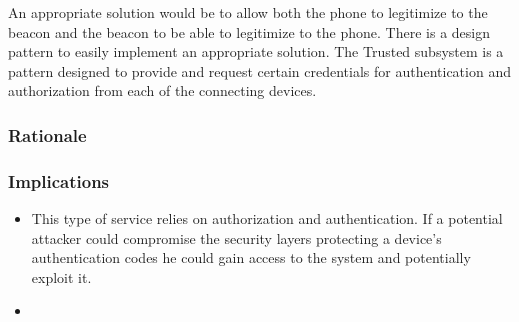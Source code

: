 		An appropriate solution would be to allow both the phone to legitimize to the beacon and the beacon to be able to legitimize to the phone. There is a design pattern to easily implement an appropriate solution. The Trusted subsystem is a pattern designed to provide and request certain credentials for authentication and authorization from each of the connecting devices.

	\subsubsection{Rationale} \label{trustedP:rationale}

	\subsubsection{Implications}
	\begin{itemize}

		\item This type of service relies on authorization and authentication. If a potential attacker could compromise the security layers protecting a device's authentication codes he could gain access to the system and potentially exploit it.
	  	\item 
	\end{itemize}

